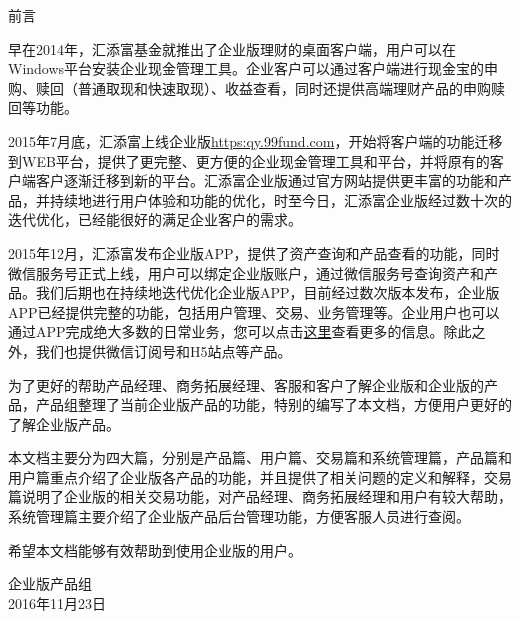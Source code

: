 \begin{center}  %
{\Large 前言}
\\[.6cm]

\end{center}


早在2014年，汇添富基金就推出了企业版理财的桌面客户端，用户可以在Windows平台安装企业现金管理工具。企业客户可以通过客户端进行现金宝的申购、赎回（普通取现和快速取现）、收益查看，同时还提供高端理财产品的申购赎回等功能。\par

2015年7月底，汇添富上线企业版\url{https:qy.99fund.com}，开始将客户端的功能迁移到WEB平台，提供了更完整、更方便的企业现金管理工具和平台，并将原有的客户端客户逐渐迁移到新的平台。汇添富企业版通过官方网站提供更丰富的功能和产品，并持续地进行用户体验和功能的优化，时至今日，汇添富企业版经过数十次的迭代优化，已经能很好的满足企业客户的需求。\par

2015年12月，汇添富发布企业版APP，提供了资产查询和产品查看的功能，同时微信服务号正式上线，用户可以绑定企业版账户，通过微信服务号查询资产和产品。我们后期也在持续地迭代优化企业版APP，目前经过数次版本发布，企业版APP已经提供完整的功能，包括用户管理、交易、业务管理等。企业用户也可以通过APP完成绝大多数的日常业务，您可以点击\href{https://qy.99fund.com/appScan/appOnline.htm}{这里}查看更多的信息。除此之外，我们也提供微信订阅号和H5站点等产品。\par

为了更好的帮助产品经理、商务拓展经理、客服和客户了解企业版和企业版的产品，产品组整理了当前企业版产品的功能，特别的编写了本文档，方便用户更好的了解企业版产品。\par

本文档主要分为四大篇，分别是产品篇、用户篇、交易篇和系统管理篇，产品篇和用户篇重点介绍了企业版各产品的功能，并且提供了相关问题的定义和解释，交易篇说明了企业版的相关交易功能，对产品经理、商务拓展经理和用户有较大帮助，系统管理篇主要介绍了企业版产品后台管理功能，方便客服人员进行查阅。\par

希望本文档能够有效帮助到使用企业版的用户。\par

\begin{flushright}
	企业版产品组\\
	2016年11月23日
\end{flushright}
